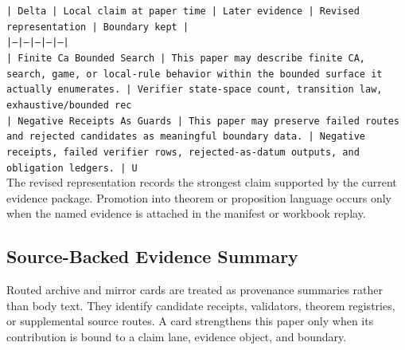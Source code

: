\documentclass[11pt]{article}
\begin{document}
\noindent\texttt{| Delta | Local claim at paper time | Later evidence | Revised representation | Boundary kept |}\\
\noindent\texttt{|---|---|---|---|---|}\\
\noindent\texttt{| Finite Ca Bounded Search | This paper may describe finite CA, search, game, or local-rule behavior within the bounded surface it actually enumerates. | Verifier state-space count, transition law, exhaustive/bounded rec}\\
\noindent\texttt{| Negative Receipts As Guards | This paper may preserve failed routes and rejected candidates as meaningful boundary data. | Negative receipts, failed verifier rows, rejected-as-datum outputs, and obligation ledgers. | U}\\

The revised representation records the strongest claim supported by the current evidence package. Promotion into theorem or proposition language occurs only when the named evidence is attached in the manifest or workbook replay.

\subsection*{Source-Backed Evidence Summary}

Routed archive and mirror cards are treated as provenance summaries rather than
body text. They identify candidate receipts, validators, theorem registries, or
supplemental source routes. A card strengthens this paper only when its
contribution is bound to a claim lane, evidence object, and boundary.
\end{document}
